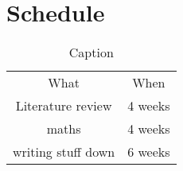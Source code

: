 \chapter{Schedule}

\begin{table}[h] %
    \centering
    \begin{tabular}{c|c}
        What & When \\
        Literature review & 4 weeks \\
        maths & 4 weeks \\
        writing stuff down & 6 weeks
    \end{tabular}
    \caption{Caption}
    \label{tab:my_label}
\end{table}